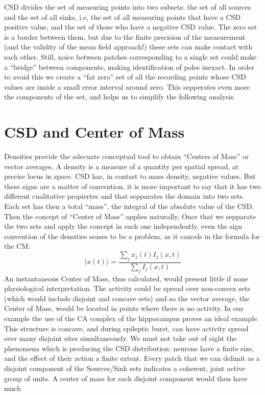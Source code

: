 \documentclass{article}
\begin{document}
CSD divides the set of measuring points into two subsets: the set of all sources and the set of all sinks, i.e, the set of all measuring points that have a CSD positive value, and the set of those who have a negative CSD value. The zero set is a border between them, but due to the finite precision of the measurement (and the validity of the mean field approach!) these sets can make contact with each other. Still, noice between patches corresponding to a single set could make a ``bridge'' between components, making identification of poles inexact. In order to avoid this we create a ``fat zero'' set of all the recording points whose CSD values are inside a small error interval around zero. This sepperates even more the components of the set, and helps us to simplify the following analysis. 

\section{CSD and Center of Mass}

Densities provide the adecuate conceptual tool to obtain ``Centers of Mass'' or vector averages. A density is a measure of a quantity per spatial spread, at precise locus in space. CSD has, in contast to mass density, negative values. But these signs are a matter of convention, it is more important to say that it has two different cualitative propiertes and that sepparates the domain into two sets. Each set has then a total ``mass'', the integral of the absolute value of the CSD. Then the concept of ``Center of Mass'' applies naturally. Once that we sepparate the two sets and apply the concept in each one independently, even the sign convention of the densities seases to be a problem, as it cancels in the formula for the CM:
\begin{equation}
\langle x(t) \rangle =\frac{\sum_j x_{j} (t) I_{j} (x,t)} {\sum_j I_{j}(x,t)}
\end{equation}
An instantaneous Center of Mass, thus calculated, would present little if none physiological interpretation. The activity could be spread over non-convex sets (which would include disjoint and concave sets) and so the vector average, the Center of Mass, would be located in points where there is no activity. In our example the use of the CA complex of the hippocampus proves an ideal example. This structure is concave, and during epileptic burst, can have activity spread over many disjoint sites simultaneously. We must not take out of sight the phenomena which is producing the CSD distribution: neurons have a finite size, and the effect of their action a finite extent. Every patch that we can delimit as a disjoint component of the Sources/Sink sets indicates a coherent, joint active group of units. A center of mass for each disjoint component would then have much  
\end{document}
